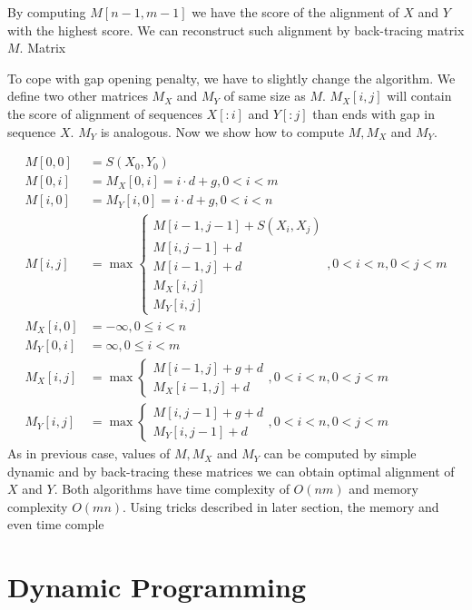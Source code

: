 By computing $M[n-1,m-1]$ we have the score of the alignment of $X$ and $Y$ with
the highest score. We can reconstruct such alignment by back-tracing matrix $M$.
Matrix 

To cope with gap opening penalty, we have to slightly change the algorithm.
We define two other matrices $M_X$ and $M_Y$ of same size as $M$. $M_X[i,j]$
will contain the score of alignment of sequences $X[:i]$ and $Y[:j]$ than ends
with gap in sequence $X$. $M_Y$ is analogous. Now we show how to compute $M,M_X$
and $M_Y$. 

\begin{align}
M[0,0] &= S(X_0,Y_0)\\
M[0,i] &= M_X[0,i] = i\cdot d+g, 0 < i < m\\
M[i,0] &= M_Y[i,0] = i\cdot d+g, 0 < i < n\\
M[i,j] &= \max
\begin{cases}
 M[i-1,j-1]+S(X_i,X_j)\\
 M[i,j-1]+d\\
 M[i-1,j]+d\\
 M_X[i,j]\\
 M_Y[i,j]
\end{cases}, 0<i<n,0<j<m\\
M_X[i,0] &= -\infty, 0\leq i< n\\
M_Y[0,i] &= \infty, 0 \leq i< m\\
M_X[i,j] &= \max
\begin{cases}
M[i-1,j]+g+d\\
M_X[i-1,j]+d
\end{cases}, 0<i<n,0<j<m\\
M_Y[i,j] &= \max
\begin{cases}
M[i,j-1]+g+d\\
M_Y[i,j-1]+d
\end{cases}, 0<i<n,0<j<m
\end{align}
As in previous case, values of $M,M_X$ and $M_Y$ can be computed by simple
dynamic and by back-tracing these matrices we can obtain optimal alignment of
$X$ and $Y$.
Both algorithms have time complexity of $O(nm)$ and memory complexity $O(mn)$.
Using tricks described in later section, the memory and even time comple

\section{Dynamic Programming}\label{DYNPROG}


